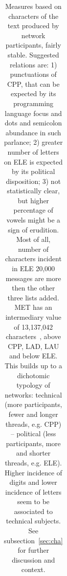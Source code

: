 \documentclass[%
 aip,
 jmp,%
 amsmath,amssymb,
 reprint,%
]{revtex4-1}
\begin{document}
\begin{table}
\begin{tabular}{|l|| c|c|c|c||  c|c|c|c||   c|c|c|c||   c|c|c|c|}
  \end{tabular}
  \caption{Measures based on characters of the text produced by network participants, fairly stable. Suggested relations are: 1) punctuations of CPP, that can be expected by its programming language focus and dots and semicolon abundance in such parlance; 2) greater number of letters on ELE is expected by its political disposition; 3) not statistically clear, but higher percentage of vowels might be a sign of erudition. Most of all, number of characters incident in ELE 20,000 messages are more then the other three lists added. MET has an intermediary value of 13,137,042 characters~\cite{evoSN}, above CPP, LAD, LAU and below ELE. This builds up to a dichotomic typology of networks: technical (more participants, fewer and longer threads, e.g. CPP) -- political (less participants, more and shorter threads, e.g. ELE). Higher incidence of digits and lower incidence of letters seem to be associated to technical subjects. See subsection~\ref{sec:cha} for further discussion and context.}
  \label{tab:cha}
\end{table}
\end{document}
